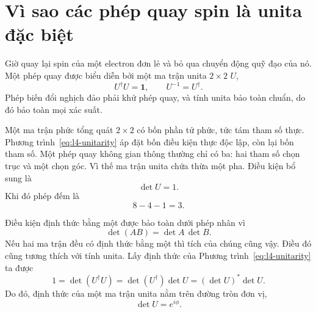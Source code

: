 \section{Vì sao các phép quay spin là unita đặc biệt}

Giờ quay lại spin của một electron đơn lẻ và bỏ qua chuyển động quỹ đạo của nó. Một phép quay được biểu diễn bởi một ma trận unita \(2\times2\) \(U\),
\begin{equation}
U^\dagger U=\boldsymbol 1,
\qquad
U^{-1}=U^\dagger.
\label{eq:l4-unitarity}
\end{equation}
Phép biến đổi nghịch đảo phải khử phép quay, và tính unita bảo toàn chuẩn, do đó bảo toàn mọi xác suất.

Một ma trận phức tổng quát \(2\times2\) có bốn phần tử phức, tức tám tham số thực. Phương trình~\eqref{eq:l4-unitarity} áp đặt bốn điều kiện thực độc lập, còn lại bốn tham số. Một phép quay không gian thông thường chỉ có ba: hai tham số chọn trục và một chọn góc. Vì thế ma trận unita chứa thừa một pha. Điều kiện bổ sung là
\begin{equation}
\det U=1.
\label{eq:l4-det-one}
\end{equation}
Khi đó phép đếm là
\begin{equation}
8-4-1=3.
\end{equation}

Điều kiện định thức bằng một được bảo toàn dưới phép nhân vì
\begin{equation}
\det(AB)=\det A\,\det B.
\end{equation}
Nếu hai ma trận đều có định thức bằng một thì tích của chúng cũng vậy. Điều đó cũng tương thích với tính unita. Lấy định thức của Phương trình~\eqref{eq:l4-unitarity} ta được
\begin{equation}
1=\det(U^\dagger U)
=\det(U^\dagger)\det U
=(\det U)^*\det U.
\end{equation}
Do đó, định thức của một ma trận unita nằm trên đường tròn đơn vị,
\begin{equation}
\det U=e^{i\phi}.
\end{equation}

\begin{classroomqa}
\end{classroomqa}

